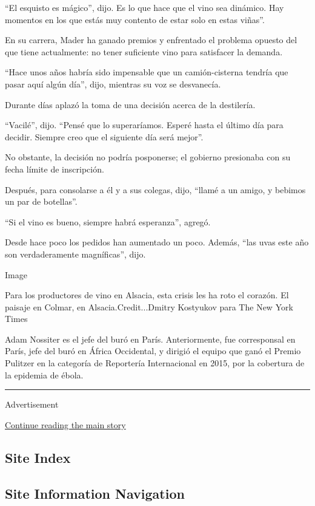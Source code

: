 ``El esquisto es mágico'', dijo. Es lo que hace que el vino sea
dinámico. Hay momentos en los que estás muy contento de estar solo en
estas viñas''.

En su carrera, Mader ha ganado premios y enfrentado el problema opuesto
del que tiene actualmente: no tener suficiente vino para satisfacer la
demanda.

``Hace unos años habría sido impensable que un camión-cisterna tendría
que pasar aquí algún día'', dijo, mientras su voz se desvanecía.

Durante días aplazó la toma de una decisión acerca de la destilería.

``Vacilé'', dijo. ``Pensé que lo superaríamos. Esperé hasta el último
día para decidir. Siempre creo que el siguiente día será mejor''.

No obstante, la decisión no podría posponerse; el gobierno presionaba
con su fecha límite de inscripción.

Después, para consolarse a él y a sus colegas, dijo, ``llamé a un amigo,
y bebimos un par de botellas''.

``Si el vino es bueno, siempre habrá esperanza'', agregó.

Desde hace poco los pedidos han aumentado un poco. Además, ``las uvas
este año son verdaderamente magníficas'', dijo.

Image

Para los productores de vino en Alsacia, esta crisis les ha roto el
corazón. El paisaje en Colmar, en Alsacia.Credit...Dmitry Kostyukov para
The New York Times

Adam Nossiter es el jefe del buró en París. Anteriormente, fue
corresponsal en París, jefe del buró en África Occidental, y dirigió el
equipo que ganó el Premio Pulitzer en la categoría de Reportería
Internacional en 2015, por la cobertura de la epidemia de ébola.

\begin{center}\rule{0.5\linewidth}{\linethickness}\end{center}

Advertisement

\protect\hyperlink{after-bottom}{Continue reading the main story}

\hypertarget{site-index}{%
\subsection{Site Index}\label{site-index}}

\hypertarget{site-information-navigation}{%
\subsection{Site Information
Navigation}\label{site-information-navigation}}

